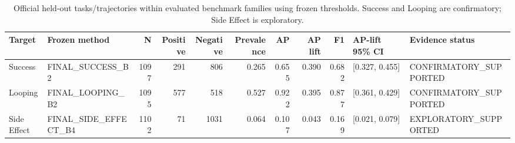 \begin{table}[t]
\centering
\scriptsize
\caption{Official held-out tasks/trajectories within evaluated benchmark families using frozen thresholds. Success and Looping are confirmatory; Side Effect is exploratory.}
\label{tab:main-heldout-results}
\begin{tabular}{lp{}rrrrrrrp{}p{}}
\hline
Target & Frozen method & N & Positive & Negative & Prevalence & AP & AP lift & F1 & AP-lift 95\% CI & Evidence status \\
\hline
Success & FINAL\_SUCCESS\_B2 & 1097 & 291 & 806 & 0.265 & 0.655 & 0.390 & 0.682 & [0.327, 0.455] & CONFIRMATORY\_SUPPORTED \\
Looping & FINAL\_LOOPING\_B2 & 1095 & 577 & 518 & 0.527 & 0.922 & 0.395 & 0.877 & [0.361, 0.429] & CONFIRMATORY\_SUPPORTED \\
Side Effect & FINAL\_SIDE\_EFFECT\_B4 & 1102 & 71 & 1031 & 0.064 & 0.107 & 0.043 & 0.169 & [0.021, 0.079] & EXPLORATORY\_SUPPORTED \\
\hline
\end{tabular}
\end{table}
